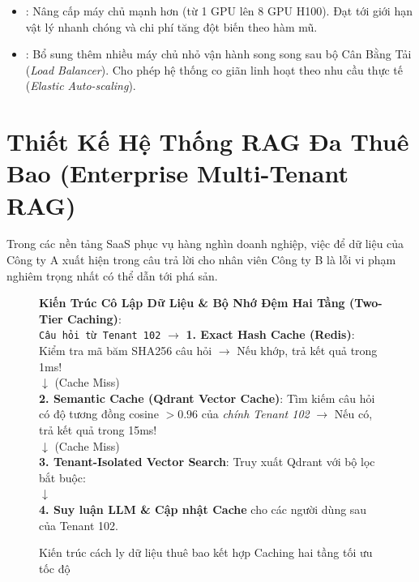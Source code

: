 \begin{definitionbox}
\begin{itemize}
  \item {}: Nâng cấp máy chủ mạnh hơn (từ 1 GPU lên 8 GPU H100). Đạt tới giới hạn vật lý nhanh chóng và chi phí tăng đột biến theo hàm mũ.
  \item {}: Bổ sung thêm nhiều máy chủ nhỏ vận hành song song sau bộ Cân Bằng Tải (\textit{Load Balancer}). Cho phép hệ thống co giãn linh hoạt theo nhu cầu thực tế (\textit{Elastic Auto-scaling}).
\end{itemize}
\end{definitionbox}

\section{Thiết Kế Hệ Thống RAG Đa Thuê Bao (Enterprise Multi-Tenant RAG)}
\label{sec:sysdes-multitenant}

Trong các nền tảng SaaS phục vụ hàng nghìn doanh nghiệp, việc để dữ liệu của Công ty A xuất hiện trong câu trả lời cho nhân viên Công ty B là lỗi vi phạm nghiêm trọng nhất có thể dẫn tới phá sản.

\begin{figure}[htbp]
\centering
\begin{tcolorbox}[colback=boxbg,colframe=primarycolor,width=0.95\textwidth,arc=2pt]
\small
\textbf{Kiến Trúc Cô Lập Dữ Liệu \& Bộ Nhớ Đệm Hai Tầng (Two-Tier Caching)}:\\[0.2cm]
\texttt{Câu hỏi từ Tenant 102} $\longrightarrow$ \textbf{1. Exact Hash Cache (Redis)}: Kiểm tra mã băm SHA256 câu hỏi $\longrightarrow$ Nếu khớp, trả kết quả trong 1ms!\\
$\downarrow$ (Cache Miss)\\
\textbf{2. Semantic Cache (Qdrant Vector Cache)}: Tìm kiếm câu hỏi có độ tương đồng cosine $> 0.96$ của \textit{chính Tenant 102} $\longrightarrow$ Nếu có, trả kết quả trong 15ms!\\
$\downarrow$ (Cache Miss)\\
\textbf{3. Tenant-Isolated Vector Search}: Truy xuất Qdrant với bộ lọc bắt buộc:
\\
$\downarrow$\\
\textbf{4. Suy luận LLM \& Cập nhật Cache} cho các người dùng sau của Tenant 102.
\end{tcolorbox}
\caption{Kiến trúc cách ly dữ liệu thuê bao kết hợp Caching hai tầng tối ưu tốc độ}
\label{fig:multitenant-rag}
\end{figure}

